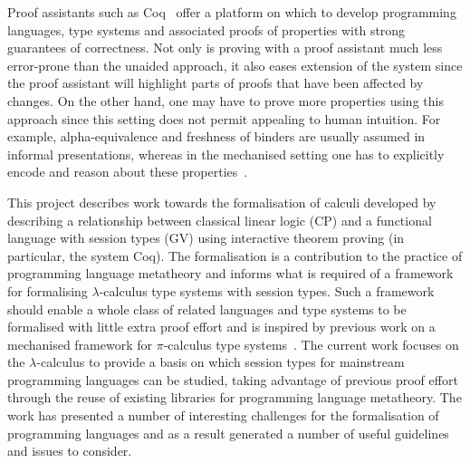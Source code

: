 Proof assistants such as Coq~\cite{Coq:manual} offer a platform on which to
develop programming languages, type systems and associated proofs of
properties with strong guarantees of correctness. Not only is proving with a
proof assistant much less error-prone than the unaided approach, it also eases
extension of the system since the proof assistant will highlight parts of
proofs that have been affected by changes. On the other hand, one may have to
prove more properties using this approach since this setting does not permit
appealing to human intuition. For example, alpha-equivalence and freshness of
binders are usually assumed in informal presentations, whereas in the
mechanised setting one has to explicitly encode and reason about these
properties~\cite{Aydemir:2005:MMM, Aydemir:2008:EFM}.

This project describes work towards the formalisation of calculi developed by
\citeauthor{Wadler:2014}~\cite{Wadler:2014} describing a relationship between
classical linear logic (CP) and a functional language with session types (GV)
using interactive theorem proving (in particular, the system Coq). The
formalisation is a contribution to the practice of programming language
metatheory and informs what is required of a framework for formalising
$\lambda$-calculus type systems with session types. Such a framework should
enable a whole class of related languages and type systems to be formalised
with little extra proof effort and is inspired by previous work on a
mechanised framework for $\pi$-calculus type systems~\cite{Gay:2001:FFP}. The
current work focuses on the $\lambda$-calculus to provide a basis on which
session types for mainstream programming languages can be studied, taking
advantage of previous proof effort through the reuse of existing libraries
for programming language metatheory. The work has presented a number of
interesting challenges for the formalisation of programming languages and as a
result generated a number of useful guidelines and issues to consider.
